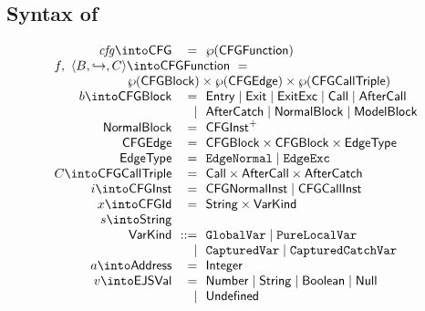 \subsection{Syntax of \CFG}
\small
\[
\begin{array}{r@{~~}r@{~~}l@{}ll}
\embox{cfg} \into \CFG & = & \powerset{\CFGFunction} & \\
\multicolumn{3}{l}{f,\ \langle B, \hookrightarrow, C \rangle \into \CFGFunction \ =}\\
\multicolumn{3}{r}{
 \powerset{\CFGBlock} \times \powerset{\CFGEdge}
\times \powerset{\CFGCallTriple}} & \\
b \into \CFGBlock & = & \multicolumn{2}{@{}l}{\Entry \mid \Exit \mid \ExitExc \mid \Call \mid \AfterCall}\\
&\mid& \multicolumn{2}{@{}l}{\AfterCatch \mid \NormalBlock \mid \ModelBlock} \\
\NormalBlock & = & \CFGInst^+ & \\
\CFGEdge & = & \CFGBlock \times \CFGBlock \times \EdgeType & \\
\EdgeType & = & \EdgeNormal \mid \EdgeExc & \\
C \into \CFGCallTriple & = & \Call \times \AfterCall \times \AfterCatch & \\

i \into \CFGInst & = & \CFGNormalInst \mid \CFGCallInst &
\\

x \into \CFGId & = & \String \times \SF{VarKind} &
\\

s \into \String &&&\\

\SF{VarKind} & ::= &
\multicolumn{2}{@{} l}{
\TT{GlobalVar} \mid \TT{PureLocalVar}}\\
&  \mid & \TT{CapturedVar} \mid \TT{CapturedCatchVar}
\\

a \into \SF{Address} & = & \SF{Integer} &
\\

v \into \SF{EJSVal} & = &
\multicolumn{2}{@{} l}{
 \SF{Number} \mid \String \mid \SF{Boolean} \mid \SF{Null}}\\
& \mid &\SF{Undefined}
\end{array}
\]

